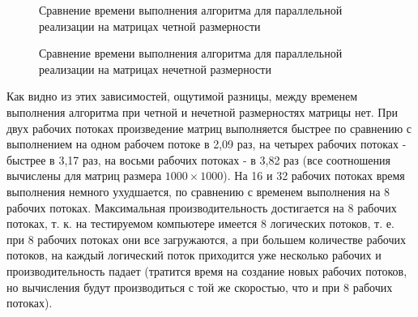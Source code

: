 \documentclass[a4paper,12pt]{article}
\begin{document}
        \begin{figure}[h!]
            \caption{Сравнение времени выполнения алгоритма для параллельной реализации на матрицах четной размерности}
            \label{fig:gtaf_1}
        \end{figure}
        
        
        \begin{figure}[h!]
            \caption{Сравнение времени выполнения алгоритма для параллельной реализации на матрицах нечетной размерности}
            \label{fig:graf_2}
        \end{figure}
        
        Как видно из этих зависимостей, ощутимой разницы, между временем выполнения алгоритма при четной и нечетной размерностях матрицы нет. При двух рабочих потоках произведение матриц выполняется быстрее по сравнению с выполнением на одном рабочем потоке в 2,09 раз, на четырех рабочих потоках - быстрее в 3,17 раз, на восьми рабочих потоках - в 3,82 раз (все соотношения вычислены для матриц размера $1000 \times 1000$). На 16 и 32 рабочих потоках время выполнения немного ухудшается, по сравнению с временем выполнения на 8 рабочих потоках. Максимальная производительность достигается на 8 рабочих потоках, т. к. на тестируемом компьютере имеется 8 логических потоков, т. е. при 8 рабочих потоках они все загружаются, а при большем количестве рабочих потоков, на каждый логический поток приходится уже несколько рабочих и производительность падает (тратится время на создание новых рабочих потоков, но вычисления будут производиться с той же скоростью, что и при 8 рабочих потоках).
        
\end{document}
